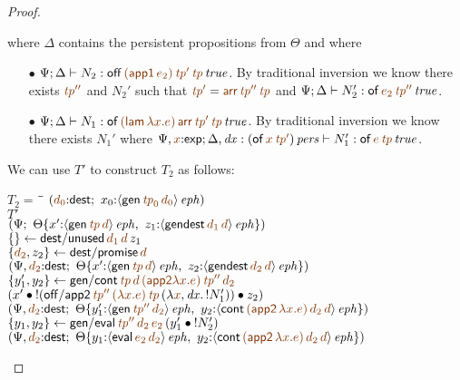 \begin{proof}
\begin{description}
where $\Delta$ contains the persistent propositions from $\Theta$ and where
\begin{itemize}
\item[$\bullet$]  
  $\Psi; \Delta \vdash N_2 : \isconc{{\sf off}\,\lf{({\sf app1}\,\lf{e_2})}\,\lf{{\it tp}'}\,\lf{{\it tp}}}$. 
  By traditional inversion we know there exists $\lf{{\it tp}''}$
  and $N_2'$ such that
  $\lf{{\it tp}'} = \lf{{\sf arr}\,{\it tp}''\,{\it tp}}$ and
  $\Psi; \Delta \vdash N_2' : \isconc{{\sf of}\,\lf{e_2}\,\lf{{\it tp}''}}$.
\item[$\bullet$] $\Psi; \Delta \vdash N_1 : \isconc{{\sf of}\,\lf{({\sf lam}\,\lambda
    x.e)}\,\lf{{\sf arr}\,{\it tp}'\,{\it tp}}}$. By traditional inversion we know there 
    exists $N_1'$ where 
    $\Psi, \lf{x}{:}{\sf exp}; \Delta, {\it dx} : \ispers{({\sf of}\,\lf{x}\,\lf{\it
      tp'})} \vdash N_1' : \isconc{{\sf of}\,\lf{e}\,\lf{\it
        tp}}$.
\end{itemize}
We can use $T'$ to construct $T_2$ as follows: 

\begin{tabbing}
$T_2 = ~$ \= \qquad \= $(\lf{d_0}{:}{\sf dest}; ~ x_0{:}\iseph{\susp{{\sf gen}\,\lf{{\it tp}_0}\,\lf{d_0}}})$
\\
\> $T'$
\\
\>\> $\left(\Psi; ~
   \tackon{\Theta}
    {x'{:}\iseph{\susp{{\sf gen}\,\lf{{\it tp}}\,\lf{d}}}, ~
     z_1{:}\iseph{\susp{{\sf gendest}\,\lf{d_1}\,\lf{d}}}
    }\right)$
\\
\> $\trstep{}{{\sf dest/unused}\,\lf{d_1}\,\lf{d}\,z_1}$
\\
\> $\trstep{\lf{d_2}, z_2}{{\sf dest/promise}\,\lf{d}}$
\\
\>\> $\left(\Psi, \lf{d_2}{:}{\sf dest}; ~
   \tackon{\Theta}
    {x'{:}\iseph{\susp{{\sf gen}\,\lf{{\it tp}}\,\lf{d}}}, ~
     z_2{:}\iseph{\susp{{\sf gendest}\,\lf{d_2}\,\lf{d}}}
    }\right)$
\\
\> $\trstep{y_1',y_2}{{\sf gen/cont}\,\lf{{\it tp}}\,\lf{d}\,
      \lf{({\sf app2}\lambda x. e)}\,\lf{{\it tp}''}\,\lf{d_2}}$
\\
\> \qquad\qquad\qquad\qquad
     $(\tfuser{x'}{\tfuser{!({\sf off/app2}\,\lf{{\it tp}''}\,\lf{(\lambda x.e)}\,\lf{{\it tp}}\,(\lambda \lf{x}, {\it dx}.\,\tbangr{N_1'}))}{z_2}})$
\\
\>\> $\left(\Psi, \lf{d_2}{:}{\sf dest}; ~
   \tackon{\Theta}
    {y_1'{:}\iseph{\susp{{\sf gen}\,\lf{{\it tp}''}\,\lf{d_2}}}, ~
     y_2{:}\iseph{\susp{{\sf cont}\,\lf{({\sf app2}\,\lambda x.e)}\,\lf{d_2}\,\lf{d}}}
    }\right)$
\\
\> $\trstep{y_1, y_2}{{\sf gen/eval}\,\lf{{\it tp}''}\,\lf{d_2}\,\lf{e_2}\,
      (\tfuser{y_1'}{\tbangr{N_2'}})}$
\\
\>\> $\left(\Psi, \lf{d_2}{:}{\sf dest}; ~
   \tackon{\Theta}
    {y_1{:}\iseph{\susp{{\sf eval}\,\lf{e_2}\,\lf{d_2}}}, ~
     y_2{:}\iseph{\susp{{\sf cont}\,\lf{({\sf app2}\,\lambda x.e)}\,\lf{d_2}\,\lf{d}}}
    }\right)$
\end{tabbing}


\end{description}
\end{proof}
